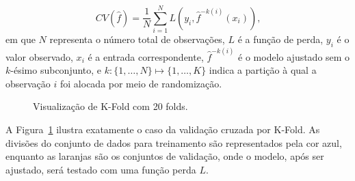 \documentclass[
  12pt,
  a4paper,
]{scrreprt}
\begin{document}
\[
CV\left(\hat f\right) = \frac{1}{N}\sum_{i = 1}^N L\left(y_i, \hat{f}^{-k\left(i\right)}\left(x_i\right)\right)\text{,}
\] em que \(N\) representa o número total de observações, \(L\) é a
função de perda, \(y_i\) é o valor observado, \(x_i\) é a entrada
correspondente, \(\hat{f}^{-k(i)}\) é o modelo ajustado sem o
\(k\)-ésimo subconjunto, e
\(k: \{1, \dots, N\} \mapsto \{1, \dots, K\}\) indica a partição à qual
a observação \(i\) foi alocada por meio de randomização.

\begin{figure}


\caption{\label{fig-kfold}Visualização de K-Fold com 20 folds.}

\end{figure}%

\vspace{12pt}

A Figura~\ref{fig-kfold} ilustra exatamente o caso da validação cruzada
por K-Fold. As divisões do conjunto de dados para treinamento são
representados pela cor azul, enquanto as laranjas são os conjuntos de
validação, onde o modelo, após ser ajustado, será testado com uma função
perda \(L\).

\vspace{12pt}
\end{document}
